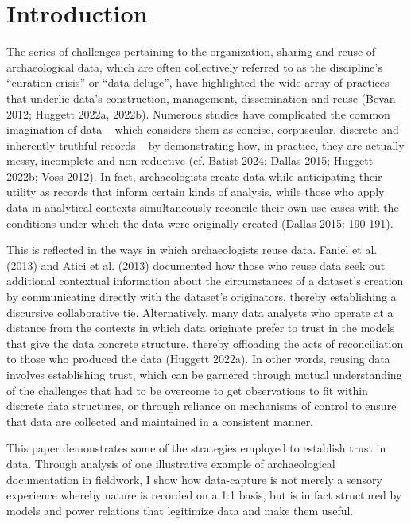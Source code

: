 \documentclass[
]{article}
\begin{document}
\section{Introduction}\label{introduction}

The series of challenges pertaining to the organization, sharing and
reuse of archaeological data, which are often collectively referred to
as the discipline's ``curation crisis'' or ``data deluge'', have
highlighted the wide array of practices that underlie data's
construction, management, dissemination and reuse (Bevan 2012; Huggett
2022a, 2022b). Numerous studies have complicated the common imagination
of data -- which considers them as concise, corpuscular, discrete and
inherently truthful records -- by demonstrating how, in practice, they
are actually messy, incomplete and non-reductive (cf. Batist 2024;
Dallas 2015; Huggett 2022b; Voss 2012). In fact, archaeologists create
data while anticipating their utility as records that inform certain
kinds of analysis, while those who apply data in analytical contexts
simultaneously reconcile their own use-cases with the conditions under
which the data were originally created (Dallas 2015: 190-191).

This is reflected in the ways in which archaeologists reuse data. Faniel
et al. (2013) and Atici et al. (2013) documented how those who reuse
data seek out additional contextual information about the circumstances
of a dataset's creation by communicating directly with the dataset's
originators, thereby establishing a discursive collaborative tie.
Alternatively, many data analysts who operate at a distance from the
contexts in which data originate prefer to trust in the models that give
the data concrete structure, thereby offloading the acts of
reconciliation to those who produced the data (Huggett 2022a). In other
words, reusing data involves establishing trust, which can be garnered
through mutual understanding of the challenges that had to be overcome
to get observations to fit within discrete data structures, or through
reliance on mechanisms of control to ensure that data are collected and
maintained in a consistent manner.

This paper demonstrates some of the strategies employed to establish
trust in data. Through analysis of one illustrative example of
archaeological documentation in fieldwork, I show how data-capture is
not merely a sensory experience whereby nature is recorded on a 1:1
basis, but is in fact structured by models and power relations that
legitimize data and make them useful.
\end{document}

